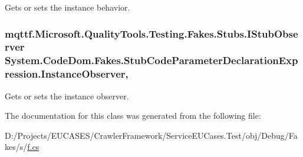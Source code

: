Gets or sets the instance behavior.

\hypertarget{class_system_1_1_code_dom_1_1_fakes_1_1_stub_code_parameter_declaration_expression_aeb413c1cb159ad9571d65e524b59d251}{
\subsubsection[{Instance\-Observer}]{\setlength{\rightskip}{0pt plus 5cm}mqttf.\-Microsoft.\-Quality\-Tools.\-Testing.\-Fakes.\-Stubs.\-I\-Stub\-Observer System.\-Code\-Dom.\-Fakes.\-Stub\-Code\-Parameter\-Declaration\-Expression.\-Instance\-Observer\hspace{0.3cm}{\ttfamily [get]}, {\ttfamily [set]}}}\label{class_system_1_1_code_dom_1_1_fakes_1_1_stub_code_parameter_declaration_expression_aeb413c1cb159ad9571d65e524b59d251}


Gets or sets the instance observer.



The documentation for this class was generated from the following file\-:\begin{DoxyCompactItemize}
\item 
D\-:/\-Projects/\-E\-U\-C\-A\-S\-E\-S/\-Crawler\-Framework/\-Service\-E\-U\-Cases.\-Test/obj/\-Debug/\-Fakes/s/\hyperlink{s_2f_8cs}{f.\-cs}\end{DoxyCompactItemize}
